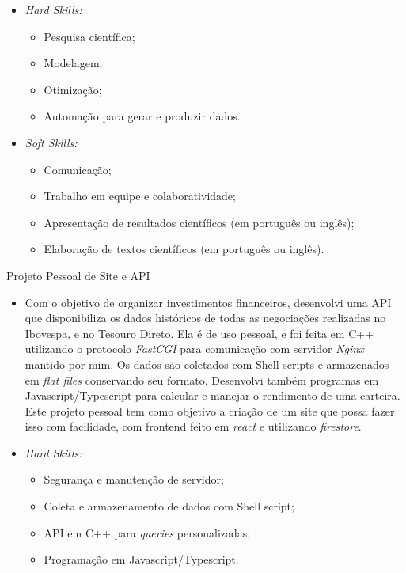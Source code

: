 \documentclass[a4paper,10pt]{article}
\newlength{\cvcolumngapwidth}
\newlength{\cvleftcolumnwidth}
\newlength{\cvrightcolumnwidth}
\newcommand{\cvtitlestyle}[1]{{\normalsize\cvtitlefont\textcolor{cvtitlecolor}{#1}}}
\newcommand{\cvdurationstyle}[1]{{\normalsize\cvdurationfont\textcolor{cvdurationcolor}{#1}}}
\newlength{\cvafteritemskipamount}
\newlength{\cvaftertitleskipamount}
\newlength{\cvparskip}
\newcommand{\cvitem}[2]{
    \begin{minipage}[t]{\cvleftcolumnwidth}
        \raggedleft #1
    \end{minipage}%
    \hspace{\cvcolumngapwidth}%
    \begin{minipage}[t]{\cvrightcolumnwidth}
        \setlength{\parskip}{\cvparskip} #2
    \end{minipage}
    \vspace{\cvafteritemskipamount}}
\newcommand{\cvtitle}[1]{
    \cvtitlestyle{#1}
    \vspace{\cvaftertitleskipamount}
    \vspace{-\cvparskip}}
\begin{document}
{\begin{itemize}[leftmargin=*]
        \item \textit{Hard Skills:} 
            \begin{itemize}
            \item Pesquisa científica;
            \item Modelagem;
            \item Otimização;
            \item Automação para gerar e produzir dados.
            \end{itemize}
        \item \textit{Soft Skills:}    
            \begin{itemize}
            \item Comunicação;
            \item Trabalho em equipe e colaboratividade; 
            \item Apresentação de resultados científicos (em português ou inglês); 
            \item Elaboração de textos científicos (em português ou inglês).
            \end{itemize}
    \end{itemize}
    
    }
    
\cvitem{\cvdurationstyle{2020 - Presente}}
    {\cvtitle{Projeto Pessoal de Site e API}
    
    \begin{itemize}[leftmargin=*]
        \vspace{0.2cm}
    
    \item Com o objetivo de organizar investimentos financeiros, desenvolvi uma API que disponibiliza os dados históricos de todas as negociações realizadas no Ibovespa, e no Tesouro Direto.
    Ela é de uso pessoal, e foi feita em C++ utilizando o protocolo \textit{FastCGI} para comunicação com servidor \textit{Nginx} mantido por mim. 
    Os dados são coletados com Shell scripts e armazenados em \textit{flat files} conservando seu formato. Desenvolvi também programas em Javascript/Typescript 
    para calcular e manejar o rendimento de uma carteira. Este projeto pessoal tem como objetivo a criação de um site que possa fazer isso com facilidade, com frontend
    feito em \textit{react} e utilizando \textit{firestore}.
    \newline\newline
    \item \textit{Hard Skills:} 
            \begin{itemize}
            \item Segurança e manutenção de servidor;
            \item Coleta e armazenamento de dados com Shell script;
            \item API em C++ para \textit{queries} personalizadas;
            \item Programação em Javascript/Typescript.
            \end{itemize}
    \end{itemize}
    }
    
\end{document}
